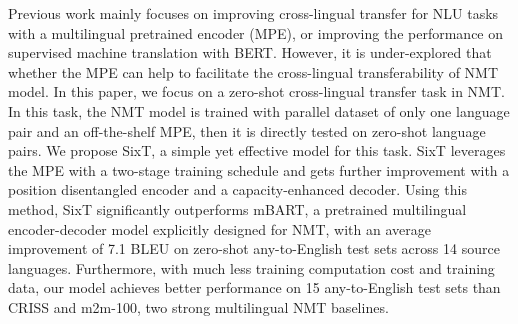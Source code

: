Previous work mainly focuses on improving cross-lingual transfer for NLU tasks with a multilingual pretrained encoder (MPE), or improving the performance on supervised machine translation with BERT. However, it is under-explored that whether the MPE can help to facilitate the cross-lingual transferability of NMT model. In this paper, we focus on a zero-shot cross-lingual transfer task in NMT. In this task, the NMT model is trained with parallel dataset of only one language pair and an off-the-shelf MPE, then it is directly tested on zero-shot language pairs. We propose SixT, a simple yet effective model for this task. SixT leverages the MPE with a two-stage training schedule and gets further improvement with a position disentangled encoder and a capacity-enhanced decoder. Using this method, SixT significantly outperforms mBART, a pretrained multilingual encoder-decoder model explicitly designed for NMT, with an average improvement of 7.1 BLEU on zero-shot any-to-English test sets across 14 source languages. Furthermore, with much less training computation cost and training data, our model achieves better performance on 15 any-to-English test sets than CRISS and m2m-100, two strong multilingual NMT baselines.
